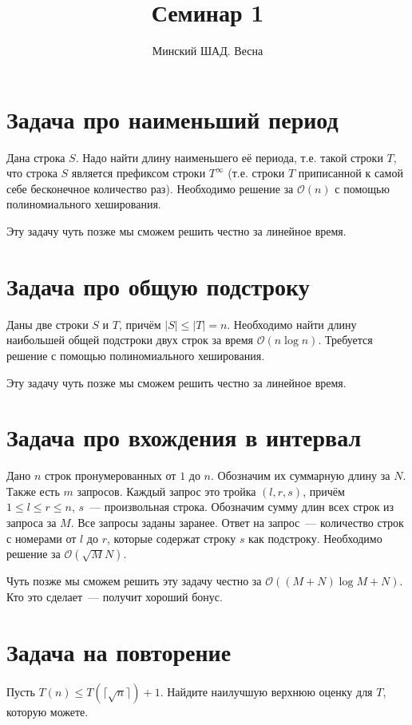 \documentclass[addpoints]{exam}
\title{Семинар 1}
\author{Минский ШАД. Весна}
\begin{document}
\maketitle

\section{Задача про наименьший период}

Дана строка $S$. Надо найти длину наименьшего её периода, т.е. такой строки $T$, что строка $S$ является префиксом строки $T^{\infty}$ (т.е. строки $T$ приписанной к самой себе бесконечное количество раз). Необходимо решение за $\mathcal{O}(n)$ с помощью полиномиального хеширования. 

Эту задачу чуть позже мы сможем решить честно за линейное время.

\section{Задача про общую подстроку}

Даны две строки $S$ и $T$, причём $|S| \leqslant |T| = n$. Необходимо найти длину наибольшей общей подстроки двух строк за время $\mathcal{O}(n \log{n})$. Требуется решение с помощью полиномиального хеширования. 

Эту задачу чуть позже мы сможем решить честно за линейное время.

\section{Задача про вхождения в интервал}

Дано $n$ строк пронумерованных от $1$ до $n$. Обозначим их суммарную длину за $N$. Также есть $m$ запросов. Каждый запрос это тройка $(l, r, s)$, причём $1 \leqslant l \leqslant r \leqslant n$, $s$~--- произвольная строка. Обозначим сумму длин всех строк из запроса за $M$. Все запросы заданы заранее. Ответ на запрос~--- количество строк с номерами от $l$ до $r$, которые содержат строку $s$ как подстроку. Необходимо решение за $\mathcal{O}(\sqrt{M} N)$.

Чуть позже мы сможем решить эту задачу честно за $\mathcal{O}((M+N)\log{M+N})$. Кто это сделает~--- получит хороший бонус.

\section{Задача на повторение}

Пусть $T(n) \leqslant T( \lceil \sqrt{n} \rceil ) + 1$. Найдите наилучшую верхнюю оценку для $T$, которую можете.
\end{document}
